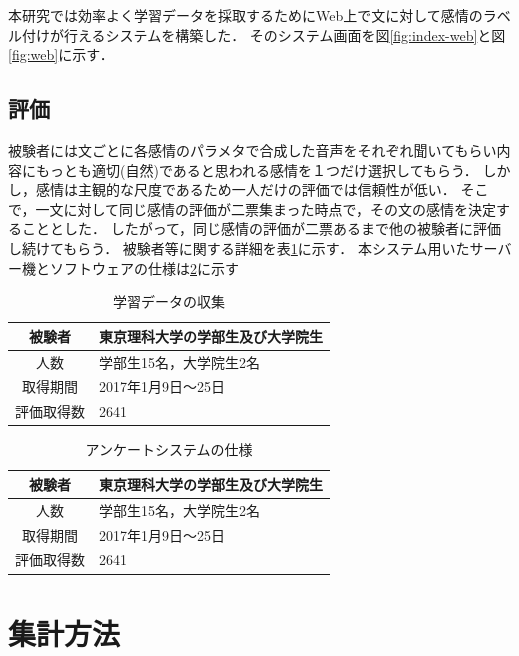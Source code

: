 本研究では効率よく学習データを採取するためにWeb上で文に対して感情のラベル付けが行えるシステムを構築した．
そのシステム画面を図\ref{fig:index-web}と図\ref{fig:web}に示す．

\subsection{評価}
被験者には文ごとに各感情のパラメタで合成した音声をそれぞれ聞いてもらい内容にもっとも適切(自然)であると思われる感情を１つだけ選択してもらう．
しかし，感情は主観的な尺度であるため一人だけの評価では信頼性が低い．
そこで，一文に対して同じ感情の評価が二票集まった時点で，その文の感情を決定することとした．
したがって，同じ感情の評価が二票あるまで他の被験者に評価し続けてもらう．
被験者等に関する詳細を表\ref{enviroment}に示す．
本システム用いたサーバー機とソフトウェアの仕様は\ref{server}に示す

\begin{table}[ht]
  \begin{center}
  \caption{学習データの収集}
  \label{enviroment}
  \begin{tabular}{|c|l|}
    \hline
    被験者 & 東京理科大学の学部生及び大学院生 \\ \hline
    人数 & 学部生15名，大学院生2名 \\ \hline
    取得期間 & 2017年1月9日〜25日 \\ \hline
    評価取得数 & 2641 \\ \hline
  \end{tabular}
  \end{center}
\end{table}


\begin{table}[ht]
  \begin{center}
  \caption{アンケートシステムの仕様}
  \label{server}
  \begin{tabular}{|c|l|}
    \hline
    被験者 & 東京理科大学の学部生及び大学院生 \\ \hline
    人数 & 学部生15名，大学院生2名 \\ \hline
    取得期間 & 2017年1月9日〜25日 \\ \hline
    評価取得数 & 2641 \\ \hline
  \end{tabular}
  \end{center}
\end{table}

\section{集計方法}

